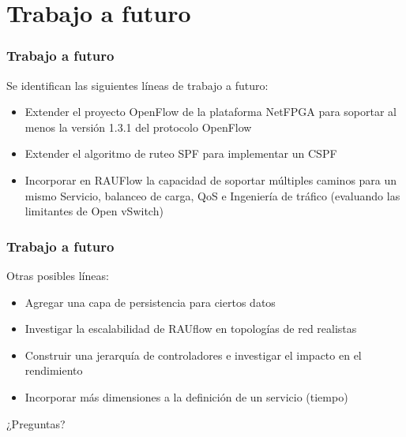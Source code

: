 \documentclass{beamer}
\begin{document}


\section{Trabajo a futuro} 
\frame{\tableofcontents[currentsection]}

\begin{frame}
\frametitle{Trabajo a futuro} 

Se identifican las siguientes l\'ineas de trabajo a futuro:
\pause

\begin{itemize}[<+->]

\item Extender el proyecto OpenFlow de la plataforma NetFPGA para soportar al menos la versi\'on 1.3.1 del protocolo OpenFlow

\item Extender el algoritmo de ruteo SPF para implementar un CSPF

\item Incorporar en RAUFlow la capacidad de soportar m\'ultiples caminos para un mismo Servicio,  balanceo de carga, QoS e Ingenier\'ia de tr\'afico (evaluando las limitantes de Open vSwitch)

\end{itemize}

\end{frame}

\begin{frame}
\frametitle{Trabajo a futuro} 

Otras posibles l\'ineas:
\pause
\begin{itemize}[<+->]

\item Agregar una capa de persistencia para ciertos datos

\item Investigar la escalabilidad de RAUflow en topolog\'ias de red realistas 

\item Construir una jerarqu\'ia de controladores e investigar el impacto en el rendimiento 

\item Incorporar m\'as dimensiones a la definici\'on de un servicio (tiempo)

\end{itemize}

\end{frame}

\begin{frame}
\centering
\Huge
¿Preguntas?

\end{frame}


\end{document}
